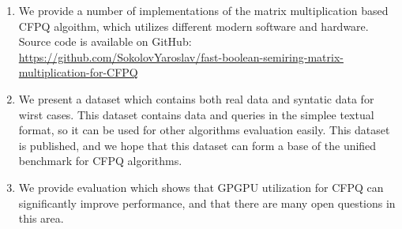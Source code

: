 \begin{enumerate}
\item We provide a number of implementations of the matrix multiplication based CFPQ algoithm, which utilizes different modern software and hardware.
Source code is available on GitHub: \href{https://github.com/SokolovYaroslav/fast-boolean-semiring-matrix-multiplication-for-CFPQ}{https://github.com/SokolovYaroslav/fast-boolean-semiring-matrix-multiplication-for-CFPQ}
\item We present a dataset which contains both real data and syntatic data for wirst cases.
This dataset contains data and queries in the simplee textual format, so it can be used for other algorithms evaluation easily.
This dataset is published, and we hope that this dataset can form a base of the unified benchmark for CFPQ algorithms.
\item We provide evaluation which shows that GPGPU utilization for CFPQ can significantly improve performance, and that there are many open questions in this area.
\end{enumerate}
